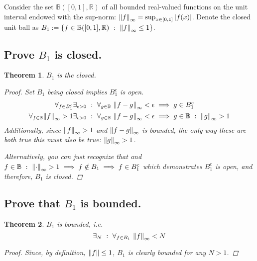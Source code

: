 \documentclass[]{article}
\newcommand{\R}{\mathbb{R}}
\newcommand{\st}{\ : \ }
\newtheorem{theorem}{Theorem}
\begin{document}
\newpage
\section{}
Consider the set $\mathbb{B}([0,1],\R)$ of all bounded real-valued functions on the unit interval endowed with the sup-norm: $\norm{f}_\infty = \sup_{x \in [0,1]} \abs{f(x)}$. Denote the closed unit ball as $B_1 := \qty{f \in \mathbb{B}([0,1],\R) \st \norm{f}_\infty \leq 1}$.


\subsection{Prove $B_1$ is closed.}
\begin{theorem}
    $B_1$ is the closed.
    \begin{proof}
        Set $B_1$ being closed implies $B_1^c$ is open.
        \begin{align*}
            \forall_{f \in B_1^c} \exists_{\epsilon>0} \st \forall_{g \in \mathbb{B}} \ \norm{f-g}_\infty < \epsilon &\implies g \in B_1^c\\
            \forall_{f \in \mathbb{B}} \norm{f}_\infty > 1 \exists_{\epsilon>0}\st \forall_{g \in \mathbb{B}} \ \norm{f-g}_\infty < \epsilon &\implies g \in \mathbb{B} \st \norm{g}_\infty > 1
        \end{align*}
        Additionally, since $\norm{f}_\infty > 1$ and $\norm{f-g}_\infty$ is bounded, the only way these are both true this must also be true: $\norm{g}_\infty > 1$.

        Alternatively, you can just recognize that and $f \in \mathbb{B}\st \norm{\cdot}_\infty > 1 \implies f \notin B_1 \implies f \in B_1^c$ which demonstrates $B_1^c$ is open, and therefore, $B_1$ is closed.
    \end{proof}    
\end{theorem}

\subsection{Prove that $B_1$ is bounded.}

\begin{theorem}
    $B_1$ is bounded, i.e.
    \[\exists_{N} \st \forall_{f \in B_1} \ \norm{f}_\infty < N\]
    \begin{proof}
        Since, by definition, $\norm{f} \leq 1$, $B_1$ is clearly bounded for any $N > 1$.
    \end{proof}
\end{theorem}
\end{document}
